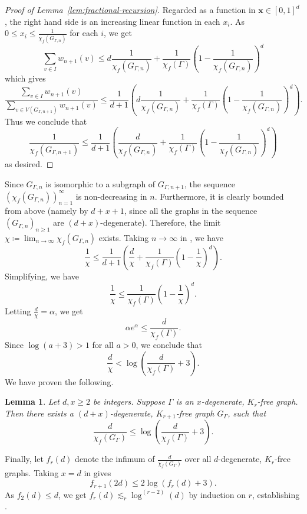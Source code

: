 \documentclass[10pt]{amsart}
\newtheorem{lemma}[theorem]{Lemma}
\theoremstyle{definition}
\begin{document}
\begin{proof}[Proof of Lemma~\ref{lem:fractional-recursion}]
    Regarded as a function in $\mathbf{x} \in [0, 1]^d$, the right hand side is an increasing linear function in each $x_i$. As $0 \leq x_i \leq \frac{1}{\chi_f(G_{\Gamma, n})}$ for each $i$, we get
    $$\sum_{v \in I} w_{n + 1}(v) \leq d \frac{1}{\chi_f(G_{\Gamma, n})} + \frac{1}{\chi_f(\Gamma)} \left(1 - \frac{1}{\chi_f(G_{\Gamma, n})}\right)^d$$
    which gives
    $$\frac{\sum_{v \in I} w_{n + 1}(v)}{\sum_{v \in V(G_{\Gamma, n + 1})} w_{n + 1}(v)} \leq \frac{1}{d + 1}\left(d \frac{1}{\chi_f(G_{\Gamma, n})} + \frac{1}{\chi_f(\Gamma)} \left(1 - \frac{1}{\chi_f(G_{\Gamma, n})}\right)^d\right).$$
    Thus we conclude that
    $$\frac{1}{\chi_f(G_{\Gamma, n + 1})} \leq \frac{1}{d + 1} \left(\frac{d}{\chi_f(G_{\Gamma, n})} + \frac{1}{\chi_f(\Gamma)}\left(1 - \frac{1}{\chi_f(G_{\Gamma, n})}\right)^d\right)$$
    as desired.
\end{proof}
Since $G_{\Gamma, n}$ is isomorphic to a subgraph of $G_{\Gamma, n  + 1}$, the sequence $(\chi_f(G_{\Gamma, n}))_{n = 1}^\infty$ is non-decreasing in $n$. Furthermore, it is clearly bounded from above (namely by $d+x+1$, since all the graphs in the sequence $(G_{
\Gamma,n})_{n\ge 1}$ are $(d+x)$-degenerate). Therefore, the limit $\chi \coloneqq \lim_{n \to \infty} \chi_f(G_{\Gamma, n})$ exists. Taking $n \to \infty$ in , we have
$$\frac{1}{\chi} \leq \frac{1}{d + 1} \left(\frac{d}{\chi} + \frac{1}{\chi_f(\Gamma)}\left(1 - \frac{1}{\chi}\right)^d\right).$$
Simplifying, we have
$$\frac{1}{\chi} \leq \frac{1}{\chi_f(\Gamma)}\left(1 - \frac{1}{\chi}\right)^d.$$
Letting $\frac{d}{\chi} = \alpha$, we get
$$\alpha e^{\alpha} \leq \frac{d}{\chi_f(\Gamma)}.$$
Since $\log (a+3) >1$ for all $a>0$, we conclude that
$$\frac{d}{\chi} < \log\left(\frac{d}{\chi_f(\Gamma)} + 3\right).$$
We have proven the following.
\begin{lemma}
\label{lem:recursion}
Let $d, x \geq 2$ be integers. Suppose $\Gamma$ is an $x$-degenerate, $K_r$-free graph. Then there exists a $(d + x)$-degenerate, $K_{r + 1}$-free graph $G_\Gamma$, such that
$$\frac{d}{\chi_f(G_\Gamma)} \leq \log\left(\frac{d}{\chi_f(\Gamma)} + 3\right).$$
\end{lemma}
Finally, let $f_r(d)$ denote the infimum of $\frac{d}{\chi_f(G_\Gamma)}$ over all $d$-degenerate, $K_r$-free graphs. Taking $x = d$ in  gives
$$f_{r + 1}(2d) \leq 2 \log(f_r(d) + 3).$$
As $f_2(d) \leq d$, we get $f_r(d) \lesssim_r \log^{(r - 2)}(d)$ by induction on $r$, establishing . 

\end{document}
